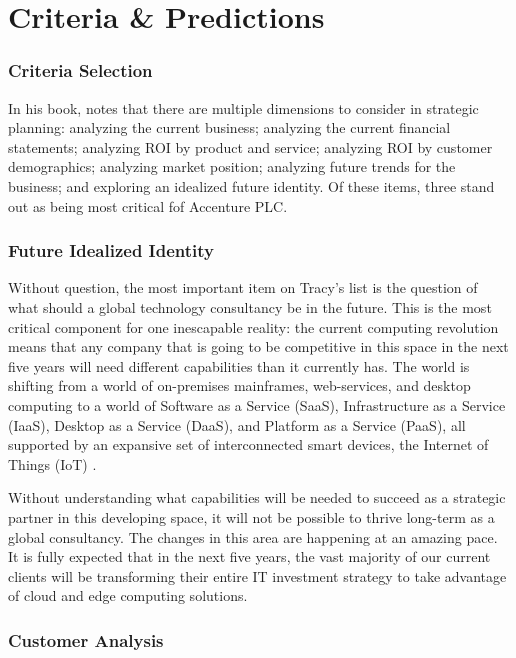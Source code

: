 
\section{Criteria \& Predictions}

\subsubsection{Criteria Selection}

In his book, \textcite{Tracy2015} notes that there are multiple dimensions to consider in strategic planning: analyzing the current business; analyzing the current financial statements; analyzing ROI by product and service; analyzing ROI by customer demographics; analyzing market position; analyzing future trends for the business; and exploring an idealized future identity. Of these items, three stand out as being most critical fof Accenture PLC.

\subsubsection{Future Idealized Identity}

Without question, the most important item on Tracy's list is the question of what should a global technology consultancy be in the future. This is the most critical component for one inescapable reality: the current computing revolution means that any company that is going to be competitive in this space in the next five years will need different capabilities than it currently has. The world is shifting from a world of on-premises mainframes, web-services, and desktop computing to a world of Software as a Service (SaaS), Infrastructure as a Service (IaaS), Desktop as a Service (DaaS), and Platform as a Service (PaaS), all supported by an expansive set of interconnected smart devices, the Internet of Things (IoT) \parencite{yangSoftwaredefinedCloudManufacturing2020,rajanServerlessArchitectureRevolution2018,nirenjenaCloudComputingRevolution2017 }.

Without understanding what capabilities will be needed to succeed as a strategic partner in this developing space, it will not be possible to thrive long-term as a global consultancy. The changes in this area are happening at an amazing pace. It is fully expected that in the next five years, the vast majority of our current clients will be transforming their entire IT investment strategy to take advantage of cloud and edge computing solutions.

\subsubsection{Customer Analysis}

